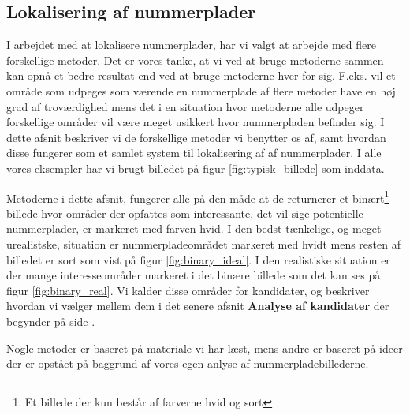\label{sec_billed}

\subsection{Lokalisering af nummerplader}

I arbejdet med at lokalisere nummerplader, har vi valgt at arbejde med flere forskellige metoder. Det er vores tanke, at vi ved at bruge metoderne sammen kan opnå et bedre resultat end ved at bruge metoderne hver for sig. F.eks. vil et område som udpeges som værende en nummerplade af flere metoder have en høj grad af troværdighed mens det i en situation hvor metoderne alle udpeger forskellige områder vil være meget usikkert hvor nummerpladen befinder sig. I dette afsnit beskriver vi de forskellige metoder vi benytter os af, samt hvordan disse fungerer som et samlet system til lokalisering af af nummerplader. I alle vores eksempler har vi brugt billedet på figur \vref{fig:typisk_billede} som inddata.

Metoderne i dette afsnit, fungerer alle på den måde at de returnerer et binært\footnote{Et billede der kun består af farverne hvid og sort} billede hvor områder der opfattes som interessante, det vil sige potentielle nummerplader, er markeret med farven hvid. I den bedst tænkelige, og meget urealistske, situation er nummerpladeområdet markeret med hvidt mens resten af billedet er sort som vist på figur \vref{fig:binary_ideal}. I den realistiske situation er der mange interesseområder markeret i det binære billede som det kan ses på figur \vref{fig:binary_real}. Vi kalder disse områder for kandidater, og beskriver hvordan vi vælger mellem dem i det senere afsnit \textbf{Analyse af kandidater} der begynder på side \pageref{sec:BinImgCleanup}.

Nogle metoder er baseret på materiale vi har læst, mens andre er baseret på ideer der er opstået på baggrund af vores egen anlyse af nummerpladebillederne. 


